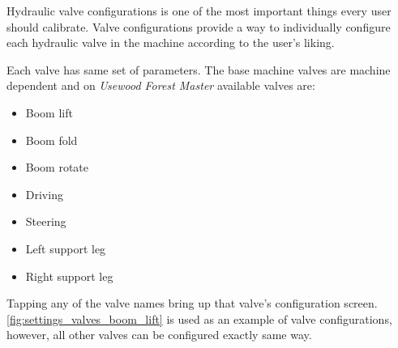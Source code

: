 \documentclass[12pt,a4paper,english]{uvmanual}
\begin{document}
Hydraulic valve configurations is one of the most important things every user should calibrate. Valve configurations provide a way to individually configure each hydraulic valve in the machine according to the user's liking. 


Each valve has same set of parameters. The base machine valves are machine dependent and on \textit{Usewood Forest Master} available valves are:

\begin{itemize}
 \item Boom lift
 \item Boom fold
 \item Boom rotate
 \item Driving
 \item Steering
 \item Left support leg
 \item Right support leg
\end{itemize}

Tapping any of the valve names bring up that valve's configuration screen. \autoref{fig:settings_valves_boom_lift} is used as an example of valve configurations, however, all other valves can be configured exactly same way.


\end{document}
